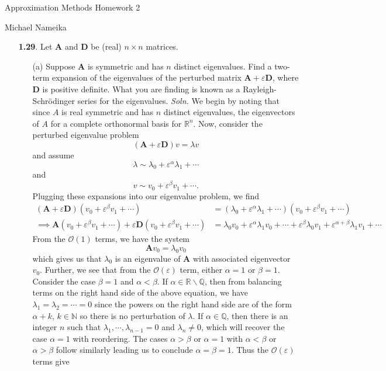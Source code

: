 \documentclass{article}
\begin{document}
\begin{center}
    {\huge Approximation Methods Homework 2}
    \vspace{0.5cm}

    {\Large Michael Nameika}
    \vspace{0.5cm}
\end{center}

\begin{itemize}
    \item[\textbf{1.29}.] Let $\mathbf{A}$ and $\mathbf{D}$ be (real) $n \times n$ matrices.
    \begin{itemize}
        \item[(a)] Suppose $\mathbf{A}$ is symmetric and has $n$ distinct eigenvalues. Find a two-term expansion of the eigenvalues of the perturbed matrix $\mathbf{A} + \varepsilon\mathbf{D}$, where $\mathbf{D}$ is positive definite. What you are finding is known as a Rayleigh-Schr{\"o}dinger series for the eigenvalues.
        \newline\newline
        \textit{Soln.} We begin by noting that since $A$ is real symmetric and has $n$ distinct eigenvalues, the eigenvectors of $A$ for a complete orthonormal basis for $\mathbb{R}^n$. Now, consider the perturbed eigenvalue problem
        \[(\mathbf{A} + \varepsilon \mathbf{D})v = \lambda v\]
        and assume
        \[\lambda \sim \lambda_0 + \varepsilon^{\alpha} \lambda_1 + \cdots\]
        and
        \[v \sim v_0 + \varepsilon^{\beta}v_1  + \cdots.\]
        Plugging these expansions into our eigenvalue problem, we find
        \begin{align*}
            (\mathbf{A} + \varepsilon \mathbf{D})(v_0 + \varepsilon^{\beta}v_1 + \cdots) &= (\lambda_0 + \varepsilon^{\alpha}\lambda_1 + \cdots)(v_0 + \varepsilon^{\beta}v_1 + \cdots)\\
            \implies \mathbf{A}(v_0 + \varepsilon^{\beta}v_1 + \cdots) + \varepsilon\mathbf{D}(v_0 + \varepsilon^{\beta}v_1 +\cdots) &= \lambda_0v_0 + \varepsilon^{\alpha}\lambda_1v_0 + \cdots + \varepsilon^{\beta}\lambda_0v_1 + \varepsilon^{\alpha + \beta}\lambda_1v_1 + \cdots
        \end{align*}
        From the $\mathcal{O}(1)$ terms, we have the system
        \[\mathbf{A}v_0 = \lambda_0v_0\]
        which gives us that $\lambda_0$ is an eigenvalue of $\mathbf{A}$ with associated eigenvector $v_0$. Further, we see that from the $\mathcal{O}(\varepsilon)$ term, either $\alpha = 1$ or $\beta = 1$. Consider the case $\beta = 1$ and $\alpha < \beta$. If $\alpha \in \mathbb{R} \backslash \mathbb{Q}$, then from balancing terms on the right hand side of the above equation, we have $\lambda_1 = \lambda_2 = \cdots = 0$ since the powers on the right hand side are of the form $\alpha + k$, $k \in \mathbb{N}$ so there is no perturbation of $\lambda$. If $\alpha \in \mathbb{Q}$, then there is an integer $n$ such that $\lambda_1,\cdots, \lambda_{n-1} = 0$ and $\lambda_n \neq 0$, which will recover the case $\alpha = 1$ with reordering. The cases $\alpha > \beta$ or $\alpha = 1$ with $\alpha < \beta$ or $\alpha > \beta$ follow similarly leading us to conclude $\alpha = \beta = 1$. Thus the $\mathcal{O}(\varepsilon)$ terms give

\end{itemize}
\end{itemize}
\end{document}
